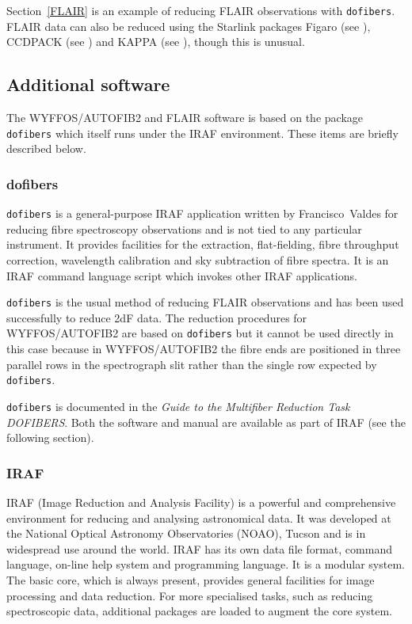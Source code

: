 \documentclass[twoside,11pt]{starlink}
\begin{document}
Section~\ref{FLAIR} is an example of reducing FLAIR observations with \texttt{dofibers}.  FLAIR data can also be reduced using the Starlink packages
Figaro (see \cite{SUN86}),
CCDPACK (see \cite{SUN139}) and
KAPPA (see \cite{SUN95}),
though this is unusual.

\subsection{Additional software}

The WYFFOS/AUTOFIB2 and FLAIR software is based on the package \texttt{dofibers} which itself runs under the IRAF environment.  These items
are briefly described below.

\subsubsection{\label{DOFIBERS}dofibers}

\texttt{dofibers} is a general-purpose IRAF application written by
Francisco~Valdes for reducing fibre spectroscopy observations and
is not tied to any particular instrument.  It provides facilities for
the extraction, flat-fielding, fibre throughput correction, wavelength
calibration and sky subtraction of fibre spectra.  It is an IRAF
command language script which invokes other IRAF applications.

\texttt{dofibers} is the usual method of reducing FLAIR observations and
has been used successfully to reduce 2dF data.  The reduction procedures
for WYFFOS/AUTOFIB2 are based on \texttt{dofibers} but it cannot be used
directly in this case because in WYFFOS/AUTOFIB2 the fibre ends are
positioned in three parallel rows in the spectrograph slit rather than
the single row expected by \texttt{dofibers}.

\texttt{dofibers} is documented in the \textit{Guide to the Multifiber
Reduction Task DOFIBERS}\/\cite{VALDES92A}.  Both the software and manual
are available as part of IRAF (see the following section).

\subsubsection{\label{IRAF}IRAF}

IRAF (Image Reduction and Analysis Facility) is a powerful and
comprehensive environment for reducing and analysing astronomical
data.  It was developed at the National Optical Astronomy Observatories
(NOAO), Tucson and is in widespread use around the world.  IRAF has
its own data file format, command language, on-line help system and
programming language.  It is a modular system.  The basic core, which
is always present, provides general facilities for image processing
and data reduction.  For more specialised tasks, such as reducing
spectroscopic data, additional packages are loaded to augment the
core system.
\end{document}

